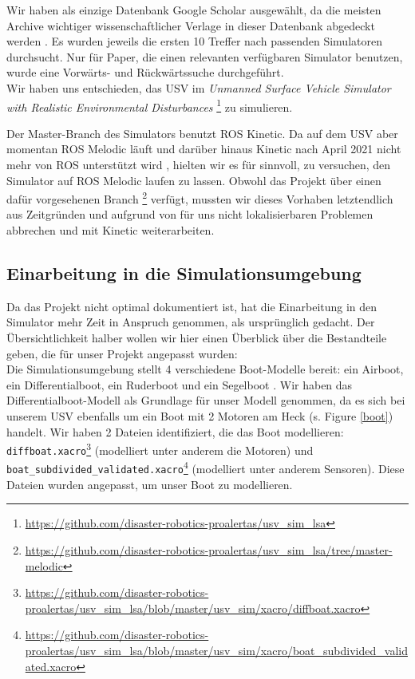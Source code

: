 \documentclass[11pt]{article}
\begin{document}
Wir haben als einzige Datenbank Google Scholar ausgewählt, da die meisten Archive wichtiger wissenschaftlicher Verlage in dieser Datenbank abgedeckt werden \cite{googlescholar}. Es wurden jeweils die ersten 10 Treffer nach passenden Simulatoren durchsucht. Nur für Paper, die einen relevanten verfügbaren Simulator benutzen, wurde eine Vorwärts- und Rückwärtssuche durchgeführt.\\

Wir haben uns entschieden, das USV im \textit{Unmanned Surface Vehicle Simulator with Realistic Environmental Disturbances} \footnote{\url{https://github.com/disaster-robotics-proalertas/usv_sim_lsa}} zu simulieren.

Der Master-Branch des Simulators benutzt ROS Kinetic. Da auf dem USV aber momentan ROS Melodic läuft und darüber hinaus Kinetic nach April 2021 nicht mehr von ROS unterstützt wird \cite{rosdistros}, hielten wir es für sinnvoll, zu versuchen, den Simulator auf ROS Melodic laufen zu lassen. Obwohl das Projekt über einen dafür vorgesehenen Branch \footnote{\url{https://github.com/disaster-robotics-proalertas/usv_sim_lsa/tree/master-melodic}} verfügt, mussten wir dieses Vorhaben letztendlich aus Zeitgründen und aufgrund von für uns nicht lokalisierbaren Problemen abbrechen und mit Kinetic weiterarbeiten.

\subsection{Einarbeitung in die Simulationsumgebung}

Da das Projekt nicht optimal dokumentiert ist, hat die Einarbeitung in den Simulator mehr Zeit in Anspruch genommen, als ursprünglich gedacht. Der Übersichtlichkeit halber wollen wir hier einen Überblick über die Bestandteile geben, die für unser Projekt angepasst wurden:\\
Die Simulationsumgebung stellt 4 verschiedene Boot-Modelle bereit: ein Airboot, ein Differentialboot, ein Ruderboot und ein Segelboot \cite{paravisi2019}. Wir haben das Differentialboot-Modell als Grundlage für unser Modell genommen, da es sich bei unserem USV ebenfalls um ein Boot mit 2 Motoren am Heck (s. Figure \ref{boot}) handelt. Wir haben 2 Dateien identifiziert, die das Boot modellieren: \texttt{diffboat.xacro}\footnote{\url{https://github.com/disaster-robotics-proalertas/usv_sim_lsa/blob/master/usv_sim/xacro/diffboat.xacro}} (modelliert unter anderem die Motoren) und \texttt{boat\_subdivided\_validated.xacro}\footnote{\url{https://github.com/disaster-robotics-proalertas/usv_sim_lsa/blob/master/usv_sim/xacro/boat_subdivided_validated.xacro}} (modelliert unter anderem Sensoren). Diese Dateien wurden angepasst, um unser Boot zu modellieren.
\end{document}
